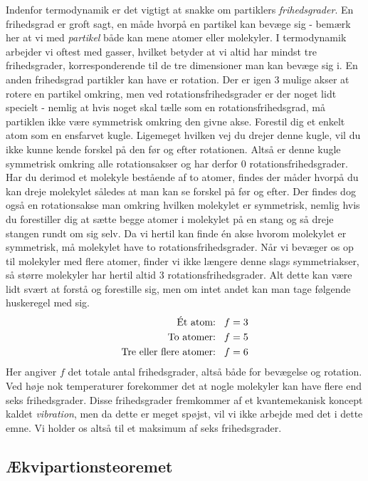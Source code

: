 \documentclass[crop=false, class=memoir]{standalone}
\begin{document}
Indenfor termodynamik er det vigtigt at snakke om partiklers \emph{frihedsgrader}. En frihedsgrad er groft sagt, en måde hvorpå en partikel kan bevæge sig - bemærk her at vi med \emph{partikel} både kan mene atomer eller molekyler. I termodynamik arbejder vi oftest med gasser, hvilket betyder at vi altid har mindst tre frihedsgrader, korresponderende til de tre dimensioner man kan bevæge sig i. En anden frihedsgrad partikler kan have er rotation. Der er igen 3 mulige akser at rotere en partikel omkring, men ved rotationsfrihedsgrader er der noget lidt specielt - nemlig at hvis noget skal tælle som en rotationsfrihedsgrad, må partiklen ikke være symmetrisk omkring den givne akse. Forestil dig et enkelt atom som en ensfarvet kugle. Ligemeget hvilken vej du drejer denne kugle, vil du ikke kunne kende forskel på den før og efter rotationen. Altså er denne kugle symmetrisk omkring alle rotationsakser og har derfor 0 rotationsfrihedsgrader. Har du derimod et molekyle bestående af to atomer, findes der måder hvorpå du kan dreje molekylet således at man kan se forskel på før og efter. Der findes dog også en rotationsakse man omkring hvilken molekylet er symmetrisk, nemlig hvis du forestiller dig at sætte begge atomer i molekylet på en stang og så dreje stangen rundt om sig selv. Da vi hertil kan finde én akse hvorom molekylet er symmetrisk, må molekylet have to rotationsfrihedsgrader. Når vi bevæger os op til molekyler med flere atomer, finder vi ikke længere denne slags symmetriakser, så større molekyler har hertil altid 3 rotationsfrihedsgrader. Alt dette kan være lidt svært at forstå og forestille sig, men om intet andet kan man tage følgende huskeregel med sig.
\begin{align}
    \text{Ét atom:}\hspace{3mm}f=3\\
    \text{To atomer:}\hspace{3mm}f=5\\
    \text{Tre eller flere atomer:}\hspace{3mm}f=6
\end{align}
Her angiver $f$ det totale antal frihedsgrader, altså både for bevægelse og rotation. Ved høje nok temperaturer forekommer det at nogle molekyler kan have flere end seks frihedsgrader. Disse frihedsgrader fremkommer af et kvantemekanisk koncept kaldet \emph{vibration}, men da dette er meget spøjst, vil vi ikke arbejde med det i dette emne. Vi holder os altså til et maksimum af seks frihedsgrader.

\subsection{Ækvipartionsteoremet}
\end{document}
